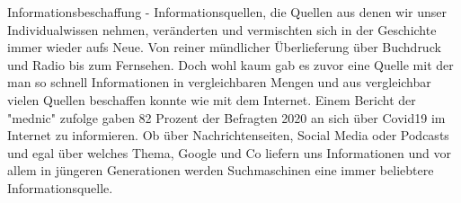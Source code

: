 \documentclass[11pt]{report}
\begin{document}
    Informationsbeschaffung - Informationsquellen, die Quellen aus denen wir unser Individualwissen nehmen, veränderten und vermischten sich in der Geschichte immer wieder aufs Neue.
    Von reiner mündlicher Überlieferung über Buchdruck und Radio bis zum Fernsehen.
    Doch wohl kaum gab es zuvor eine Quelle mit der man so schnell Informationen in vergleichbaren Mengen und aus vergleichbar vielen Quellen beschaffen konnte wie mit dem Internet.
    Einem Bericht der "mednic" zufolge gaben 82 Prozent der Befragten 2020 an sich über Covid19 im Internet zu informieren.\cite{[RKW20]}
    Ob über Nachrichtenseiten, Social Media oder Podcasts und egal über welches Thema, Google und Co liefern uns Informationen und vor allem in jüngeren Generationen werden Suchmaschinen eine immer beliebtere Informationsquelle.\\
\end{document}
